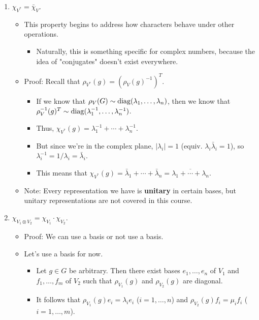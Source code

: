 \documentclass[../notes.tex]{subfiles}
\begin{document}
\begin{itemize}
\begin{enumerate}[resume]
\begin{itemize}
        \end{itemize}
        \item $\chi_{V^*}=\bar{\chi}_V$.
        \begin{itemize}
            \item This property begins to address how characters behave under other operations.
            \begin{itemize}
                \item Naturally, this is something specific for complex numbers, because the idea of "conjugates" doesn't exist everywhere.
            \end{itemize}
            \item Proof: Recall that $\rho_{V^*}(g)=(\rho_V(g)^{-1})^T$.
            \begin{itemize}
                \item If we know that $\rho_V(G)\sim\operatorname{diag}(\lambda_1,\dots,\lambda_n)$, then we know that $\rho_V^{-1}(g)^T\sim\operatorname{diag}(\lambda_1^{-1},\dots,\lambda_n^{-1})$.
                \item Thus, $\chi_{V^*}(g)=\lambda_1^{-1}+\cdots+\lambda_n^{-1}$.
                \item But since we're in the complex plane, $|\lambda_i|=1$ (equiv. $\lambda_i\bar{\lambda}_i=1$), so $\lambda_i^{-1}=1/\lambda_i=\bar{\lambda}_i$.
                \item This means that $\chi_{V^*}(g)=\bar{\lambda}_1+\cdots+\bar{\lambda}_n=\overline{\lambda_1+\cdots+\lambda_n}$.
            \end{itemize}
            \item Note: Every representation we have is \textbf{unitary} in certain bases, but unitary representations are not covered in this course.
        \end{itemize}
        \item $\chi_{V_1\otimes V_2}=\chi_{V_1}\cdot\chi_{V_2}$.
        \begin{itemize}
            \item Proof: We can use a basis or not use a basis.
            \item Let's use a basis for now.
            \begin{itemize}
                \item Let $g\in G$ be arbitrary. Then there exist bases $e_1,\dots,e_n$ of $V_1$ and $f_1,\dots,f_m$ of $V_2$ such that $\rho_{V_1}(g)$ and $\rho_{V_2}(g)$ are diagonal.
                \item It follows that $\rho_{V_1}(g)e_i=\lambda_ie_i$ ($i=1,\dots,n$) and $\rho_{V_2}(g)f_i=\mu_if_i$ ($i=1,\dots,m$).

\end{itemize}
\end{itemize}
\end{enumerate}
\end{itemize}
\end{document}
